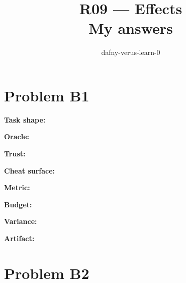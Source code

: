 \documentclass[11pt]{article}
\title{R09 --- Effects \\ \large My answers}
\author{dafny-verus-learn-0}
\date{}
\begin{document}
\maketitle
\section*{Problem B1}\label{ans:B1}
\begin{answer}
\textbf{Task shape:} \vspace{1.5cm}

\textbf{Oracle:} \vspace{1.5cm}

\textbf{Trust:} \vspace{1.5cm}

\textbf{Cheat surface:} \vspace{1.5cm}

\textbf{Metric:} \vspace{1.5cm}

\textbf{Budget:} \vspace{1.5cm}

\textbf{Variance:} \vspace{1.5cm}

\textbf{Artifact:} \vspace{1.5cm}
\end{answer}
\section*{Problem B2}\label{ans:B2}
\begin{answer}
\vspace{8cm}
\end{answer}
\end{document}
